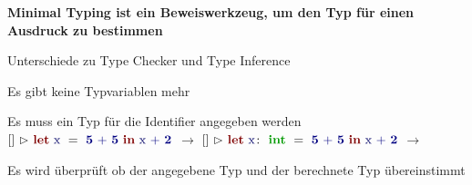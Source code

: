 {
  \textbf{Minimal Typing ist ein Beweiswerkzeug, um den Typ für einen Ausdruck zu bestimmen} \\[6mm]
  \begin{itemgroup}{Unterschiede zu Type Checker und Type Inference}
    \item Es gibt keine Typvariablen mehr
    \item Es muss ein Typ für die Identifier angegeben werden
      \catchword $\TypeEnvironment{}\ {\vartriangleright}\ {\ExprLet{\ExprIdentifier{x}}{}
         {\ExprInfixOperation{\ExprBinaryOperator{+}}{\ExprConstant{5}}{\ExprConstant{5}}}
         {\ExprInfixOperation{\ExprBinaryOperator{+}}{\ExprIdentifier{x}}{\ExprConstant{2}}}}$
      $\to$ {\color{red}{falsch}}
      \catchword $\TypeEnvironment{}\ {\vartriangleright}\ {\ExprLet{\ExprIdentifier{x}}{\TypeIntegerType}
         {\ExprInfixOperation{\ExprBinaryOperator{+}}{\ExprConstant{5}}{\ExprConstant{5}}}
         {\ExprInfixOperation{\ExprBinaryOperator{+}}{\ExprIdentifier{x}}{\ExprConstant{2}}}}$
      $\to$ {\color{green}{richtig}}
    \item Es wird überprüft ob der angegebene Typ und der berechnete Typ übereinstimmt
    
  \end{itemgroup}
}